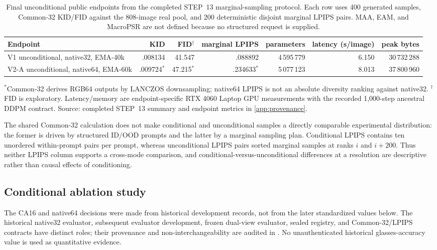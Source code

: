 \begin{table}[htbp]
\centering\small
\caption{Final unconditional public endpoints from the completed STEP~13 marginal-sampling protocol. Each row uses 400 generated samples, Common-32 KID/FID against the 808-image real pool, and 200 deterministic disjoint marginal LPIPS pairs. MAA, EAM, and MacroPSR are not defined because no structured request is supplied.}\label{tab:unconditional-final}
\begin{tabular}{lrrrrrr}
\toprule
Endpoint & KID & FID$^{\dagger}$ & marginal LPIPS & parameters & latency (s/image) & peak bytes \\
\midrule
V1 unconditional, native32, EMA-40k & .008134 & 41.547 & .088892 & 4\,595\,779 & 6.150 & 30\,732\,288 \\
V2-A unconditional, native64, EMA-60k & .009724$^{*}$ & 47.215$^{*}$ & .234633$^{*}$ & 5\,077\,123 & 8.013 & 37\,800\,960 \\
\bottomrule
\end{tabular}
\par\smallskip\footnotesize $^{*}$Common-32 derives RGB64 outputs by LANCZOS downsampling; native64 LPIPS is not an absolute diversity ranking against native32. $^{\dagger}$FID is exploratory. Latency/memory are endpoint-specific RTX 4060 Laptop GPU measurements with the recorded 1,000-step ancestral DDPM contract. Source: completed STEP~13 summary and endpoint metrics in \cref{app:provenance}.
\end{table}

The shared Common-32 calculation does not make conditional and unconditional samples a directly comparable experimental distribution: the former is driven by structured ID/OOD prompts and the latter by a marginal sampling plan. Conditional LPIPS contains ten unordered within-prompt pairs per prompt, whereas unconditional LPIPS pairs sorted marginal samples at ranks $i$ and $i+200$. Thus neither LPIPS column supports a cross-mode comparison, and conditional-versus-unconditional differences at a resolution are descriptive rather than causal effects of conditioning.

\subsection{Conditional ablation study}
The CA16 and native64 decisions were made from historical development records, not from the later standardized values below. The historical native32 evaluator, subsequent evaluator development, frozen dual-view evaluator, sealed registry, and Common-32/LPIPS contracts have distinct roles; their provenance and non-interchangeability are audited in . No unauthenticated historical glasses-accuracy value is used as quantitative evidence.

